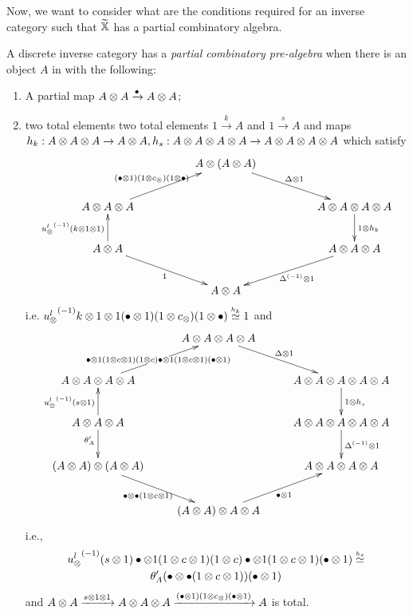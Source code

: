Now, we want to consider what are the conditions required for an inverse category \X such that $\widetilde{\mathbb{X}}$
has a partial combinatory algebra.

\begin{definition}\label{def:inverse_partial_combinatory_algebra}
  A discrete inverse category \X has a \emph{partial combinatory pre-algebra} when there is an
  object $A$ in \X with the following:
  \begin{enumerate}[{(}i{)}]
  \item A partial map $A\otimes A \xrightarrow{\bullet} A\otimes A$;
  \item two total elements two total elements $1\xrightarrow{k}A$ and $1\xrightarrow{s}{A}$ and maps
    $h_k:A\otimes A\otimes A\to A\otimes A, h_s:A\otimes A\otimes A\otimes A\to A\otimes A\otimes A\otimes A$ which satisfy
    \[
      \xymatrix@C+25pt{
         & A\*(A\*A) \ar[dr]^{\Delta\*1}\\
        A\* A\* A \ar[ur]^{(\bullet\* 1)(1\*c_\*)(1\*\bullet)} & & A\*A\*A\*A\ar[d]^{1\*h_k}\\
        A\* A \ar[u]^{\inv{\usl}(k\*1\*1)} \ar[dr]_{1} & & A\*A\*A \ar[dl]^{\inv{\Delta}\*1}\\
        & A\*A &
      }
    \]
    i.e. ${u_{\otimes}^l}^{(-1)}{k\otimes1\otimes1}(\bullet\otimes 1)(1\otimes c_\otimes)(1\otimes\bullet) \overset{\scriptscriptstyle h_k}{\simeq}1$ and
    \[
      \xymatrix{
        & A\* A\* A\* A \ar[dr]^{\Delta\*1} \\
        A\* A\* A\* A
          \ar[ur]|{\bullet\*1(1\*c\*1)(1\*c)\bullet\*1(1\*c\*1)(\bullet\*1)}&
           & A\* A\* A\* A\* A \ar[d]^{1\*h_s}\\
        A\* A\* A \ar[u]^{\inv{\usl}(s\*1)} \ar[d]_(.4){\theta_A'}
           & &A\*A\*A\*A\*A \ar[d]^{\inv{\Delta}\*1}\\
        (A\* A) \* (A\* A) \ar[dr]_{\bullet\*\bullet(1\*c\*1)} &&A\*A\*A\*A \\
         &(A\* A)\* A\* A \ar[ur]_{\bullet\*1}
      }
    \]
    i.e.,
    \begin{multline*}
      {\ensuremath{u_{\otimes}^l}}^{(-1)}(s\otimes1)\bullet\otimes1(1\otimes c\otimes1)(1\otimes c)\bullet\otimes1(1\otimes c\otimes1)(\bullet\otimes1) \overset{\scriptscriptstyle h_s}{\simeq} \\
      \theta_A'(\bullet\otimes\bullet(1\otimes c\otimes1))(\bullet\otimes1)
    \end{multline*}
    and $A\otimes A \xrightarrow{s\otimes1\otimes1} A\otimes A\otimes A \xrightarrow{(\bullet\otimes 1)(1\otimes c_\otimes)(\bullet\otimes1)} A$ is total.
  \end{enumerate}
\end{definition}




